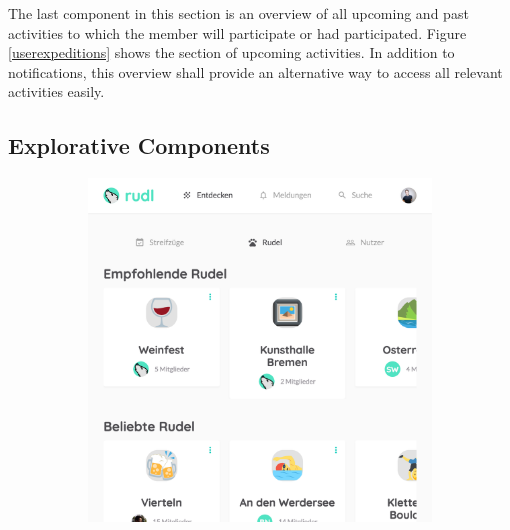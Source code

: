 \documentclass[12pt,numbers=noenddot,parskip,bibliography=totocnumbered,listof=totocnumbered,draft]{scrreprt}
\begin{document}
The last component in this section is an overview of all upcoming and past activities to which the member will participate or had participated. Figure \ref{userexpeditions} shows the section of upcoming activities. In addition to notifications, this overview shall provide an alternative way to access all relevant activities easily.

\subsection{Explorative Components}
\begin{figure}
\begin{subfigure}[t]{0.45\textwidth}
\centering
\includegraphics[width=\linewidth]{explorerudel.png}
\caption{}
\label{explorerudel}
\end{subfigure}
\hfill
\begin{subfigure}[t]{0.45\textwidth}
\centering

\end{subfigure}
\end{figure}
\end{document}
